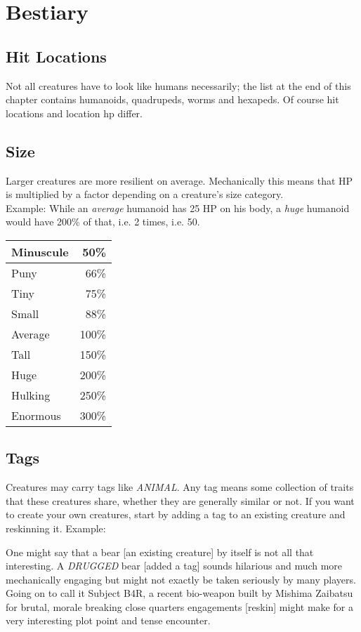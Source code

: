 \documentclass[12pt,a4paper,openany]{book}
\begin{document}
	\chapter{Bestiary}
	\section{Hit Locations}
	Not all creatures have to look like humans necessarily; the list at the end of this chapter contains humanoids, quadrupeds, worms and hexapeds. Of course hit locations and location hp differ.
	

	\section{Size}
	Larger creatures are more resilient on average. Mechanically this means that HP is multiplied by a factor depending on a creature's size category.\\
	Example: While an \emph{average} humanoid has 25 HP on his body, a \emph{huge} humanoid would have 200\% of that, i.e. 2 times, i.e. 50.
	\begin{tabularx}{\textwidth}{|l|r|}
		\hline
		Minuscule &  50\% \\ \hline
		Puny      &  66\% \\ \hline
		Tiny      &  75\% \\ \hline
		Small     &  88\% \\ \hline
		Average   & 100\% \\ \hline
		Tall      & 150\% \\ \hline
		Huge      & 200\% \\ \hline
		Hulking   & 250\% \\ \hline
		Enormous  & 300\% \\ \hline
	\end{tabularx}

	\section{Tags}
	Creatures may carry tags like \emph{ANIMAL}. Any tag means some collection of traits that these creatures share, whether they are generally similar or not. If you want to create your own creatures, start by adding a tag to an existing creature and reskinning it. Example:\par
	\begin{exampleblock}
		One might say that a bear [an existing creature] by itself is not all that interesting. A \emph{DRUGGED} bear [added a tag] sounds hilarious and much more mechanically engaging but might not exactly be taken seriously by many players. Going on to call it Subject B4R, a recent bio-weapon built by Mishima Zaibatsu for brutal, morale breaking close quarters engagements [reskin] might make for a very interesting plot point and tense encounter.
	\end{exampleblock}
	
\end{document}
